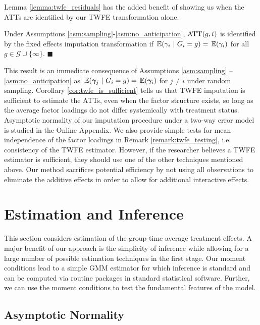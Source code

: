 \documentclass[12pt]{article}
\begin{document}
Lemma \ref{lemma:twfe_residuals} has the added benefit of showing us when the ATTs are identified by our TWFE transformation alone.
\begin{corollary}\label{cor:twfe_is_sufficient}
  Under Assumptions \ref{asm:sampling}-\ref{asm:no_anticipation}, $\text{ATT}(g,t)$ is identified by the fixed effects imputation transformation if $\expec{\gamma_i}{G_i=g} = \expec{\gamma_i}$ for all $g \in \mathcal{G} \cup \{\infty\}$. $\blacksquare$
\end{corollary}
This result is an immediate consequence of Assumptions \ref{asm:sampling} -- \ref{asm:no_anticipation} as $\expec{\bm \gamma_j}{G_i = g} = \expec{\bm \gamma_i}$ for $j \neq i$ under random sampling. 
Corollary \ref{cor:twfe_is_sufficient} tells us that TWFE imputation is sufficient to estimate the ATTs, even when the factor structure exists, so long as the average factor loadings do not differ systemically with treatment status. Asymptotic normality of our imputation procedure under a two-way error model is studied in the Online Appendix. We also provide simple tests for mean independence of the factor loadings in Remark \ref{remark:twfe_testing}, i.e. consistency of the TWFE estimator. However, if the researcher believes a TWFE estimator is sufficient, they should use one of the other techniques mentioned above. Our method sacrifices potential efficiency by not using all observations to eliminate the additive effects in order to allow for additional interactive effects.



\section{Estimation and Inference}\label{sec:estimation}

This section considers estimation of the group-time average treatment effects. A major benefit of our approach is the simplicity of inference while allowing for a large number of possible estimation techniques in the first stage. Our moment conditions lead to a simple GMM estimator for which inference is standard and can be computed via routine packages in standard statistical software. Further, we can use the moment conditions to test the fundamental features of the model.

\subsection{Asymptotic Normality}
\end{document}
